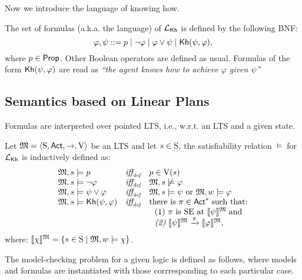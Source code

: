 Now we introduce the language of knowing how.

\begin{definition}
    \label{def:syntax}
    The set of formulas (a.k.a. the language) of $\Khlogic$ is defined by the following BNF:
    \[
        \varphi, \psi ::= p \mid \neg \varphi \mid \varphi \vee \psi \mid \kh(\psi,\varphi),
    \]
    where $p\in\Prop$. Other Boolean operators are defined as usual. Formulas of the form $\kh(\psi,\varphi)$ are read as \emph{``the agent knows how to achieve $\varphi$ given $\psi$''}
\end{definition}

\subsection{Semantics based on Linear Plans}
Formulas are interpreted over pointed LTS, i.e., w.r.t. an LTS and a given state. 

\begin{definition} \label{def:semantics-kh}
    Let $\model = \tup{\S,\Act,\ra,\V}$ be an LTS and let $s\in\S$, the satisfiability relation $\models$ for $\Khlogic$ is inductively defined as:
    \[
    \begin{array}{l@{\ \ \ }c@{\ \ \  }l}
    \model, s \models p & \iffdef & p \in \V(s) \\
    \model, s\models \neg\varphi & \iffdef & \model, s \not\models \varphi \\
    \model, s \models \psi\vee\varphi & \iffdef & \model, s \models \psi \mbox{ or }\model, w \models \varphi \\
    \model, s \models \kh(\psi,\varphi) & \iffdef & \text{there is } \plan \in \Act^* \;\text{such that:} \\
    & & \ \ \text{\rm (1)} \ \plan \text{ is SE at }  \truthset{\model}{\psi}\; \text{and} \\
    & & \ \ \text{\em (2)} \ \truthset{\model}{\psi} \reach{\plan} \truthset{\model}{\varphi}, 
    \end{array}
    \]      where: $\truthset{\model}{\chi} = \csetsc{s\in\S}{\model,w\models\chi}$. 
\end{definition}

The model-checking problem for a given logic is defined as follows, where models and formulas are instantiated with those corrresponding to each particular case. 


